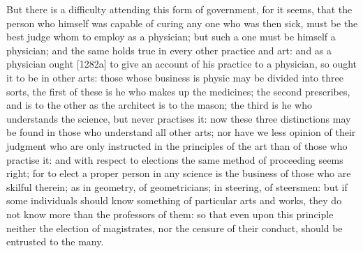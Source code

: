 But there is a difficulty attending this form of government, for it seems,
that the person who himself was capable of curing any one who was then
sick, must be the best judge whom to employ as a physician; but such a one
must be himself a physician; and the same holds true in every other
practice and art: and as a physician ought [1282a] to give an account of
his practice to a physician, so ought it to be in other arts: those whose
business is physic may be divided into three sorts, the first of these is
he who makes up the medicines; the second prescribes, and is to the other
as the architect is to the mason; the third is he who understands the
science, but never practises it: now these three distinctions may be found
in those who understand all other arts; nor have we less opinion of their
judgment who are only instructed in the principles of the art than of
those who practise it: and with respect to elections the same method of
proceeding seems right; for to elect a proper person in any science is the
business of those who are skilful therein; as in geometry, of
geometricians; in steering, of steersmen: but if some individuals should
know something of particular arts and works, they do not know more than
the professors of them: so that even upon this principle neither the
election of magistrates, nor the censure of their conduct, should be
entrusted to the many.

